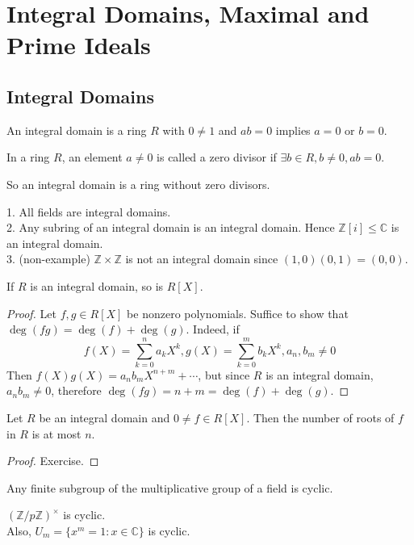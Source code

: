\section{Integral Domains, Maximal and Prime Ideals}
\subsection{Integral Domains}
\begin{definition}
    An integral domain is a ring $R$ with $0\neq 1$ and $ab=0$ implies $a=0$ or $b=0$.
\end{definition}
\begin{definition}
    In a ring $R$, an element $a\neq 0$ is called a zero divisor if $\exists b\in R,b\neq 0,ab=0$.
\end{definition}
So an integral domain is a ring without zero divisors.
\begin{example}
    1. All fields are integral domains.\\
    2. Any subring of an integral domain is an integral domain.
    Hence $\mathbb Z[i]\le\mathbb C$ is an integral domain.\\
    3. (non-example) $\mathbb Z\times\mathbb Z$ is not an integral domain since $(1,0)(0,1)=(0,0)$.
\end{example}
\begin{lemma}
    If $R$ is an integral domain, so is $R[X]$.
\end{lemma}
\begin{proof}
    Let $f,g\in R[X]$ be nonzero polynomials.
    Suffice to show that $\deg(fg)=\deg(f)+\deg(g)$.
    Indeed, if
    $$f(X)=\sum_{k=0}^na_kX^k,g(X)=\sum_{k=0}^mb_kX^k,a_n,b_m\neq 0$$
    Then $f(X)g(X)=a_nb_mX^{n+m}+\cdots$, but since $R$ is an integral domain, $a_nb_m\neq 0$, therefore $\deg(fg)=n+m=\deg(f)+\deg(g)$.
\end{proof}
\begin{lemma}
    Let $R$ be an integral domain and $0\neq f\in R[X]$.
    Then the number of roots of $f$ in $R$ is at most $n$.
\end{lemma}
\begin{proof}
    Exercise.
\end{proof}
\begin{theorem}
    Any finite subgroup of the multiplicative group of a field is cyclic.
\end{theorem}
\begin{example}
    $(\mathbb Z/p\mathbb Z)^\times$ is cyclic.\\
    Also, $U_m=\{x^m=1:x\in\mathbb C\}$ is cyclic.
\end{example}
